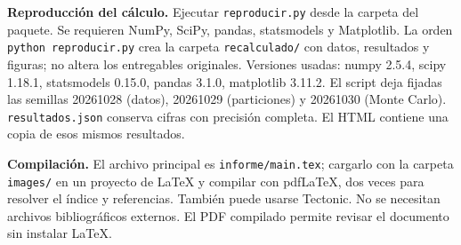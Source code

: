 \documentclass[11pt,a4paper]{article}
\begin{document}
\textbf{Reproducción del cálculo.} Ejecutar \texttt{reproducir.py} desde la carpeta del paquete. Se requieren NumPy, SciPy, pandas, statsmodels y Matplotlib. La orden \texttt{python reproducir.py} crea la carpeta \texttt{recalculado/} con datos, resultados y figuras; no altera los entregables originales. Versiones usadas: numpy 2.5.4, scipy 1.18.1, statsmodels 0.15.0, pandas 3.1.0, matplotlib 3.11.2. El script deja fijadas las semillas 20261028 (datos), 20261029 (particiones) y 20261030 (Monte Carlo). \texttt{resultados.json} conserva cifras con precisión completa. El HTML contiene una copia de esos mismos resultados.

\textbf{Compilación.} El archivo principal es \texttt{informe/main.tex}; cargarlo con la carpeta \texttt{images/} en un proyecto de LaTeX y compilar con pdfLaTeX, dos veces para resolver el índice y referencias. También puede usarse Tectonic. No se necesitan archivos bibliográficos externos. El PDF compilado permite revisar el documento sin instalar LaTeX.
\end{document}
